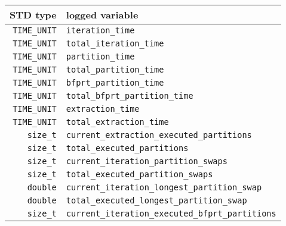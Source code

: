 \begin{tabularx}{\linewidth}{|r|X|}%
    \hline
    STD type & logged variable \\ %
    \hline
    \texttt{TIME\_UNIT} & \texttt{iteration\_time} \\ %
    \hline
    \texttt{TIME\_UNIT} & \texttt{total\_iteration\_time} \\ %
    \hline
    \texttt{TIME\_UNIT} & \texttt{partition\_time} \\ %
    \hline
    \texttt{TIME\_UNIT} & \texttt{total\_partition\_time} \\ %
    \hline
    \texttt{TIME\_UNIT} & \texttt{bfprt\_partition\_time} \\ %
    \hline
    \texttt{TIME\_UNIT} & \texttt{total\_bfprt\_partition\_time} \\ %
    \hline
    \texttt{TIME\_UNIT} & \texttt{extraction\_time} \\ %
    \hline
    \texttt{TIME\_UNIT} & \texttt{total\_extraction\_time} \\ %
    \hline
    \texttt{size\_t} & \texttt{current\_extraction\_executed\_partitions} \\ %
    \hline
    \texttt{size\_t} & \texttt{total\_executed\_partitions} \\ %
    \hline
    \texttt{size\_t} & \texttt{current\_iteration\_partition\_swaps} \\ %
    \hline
    \texttt{size\_t} & \texttt{total\_executed\_partition\_swaps} \\ %
    \hline
    \texttt{double} & \texttt{current\_iteration\_longest\_partition\_swap} \\ %
    \hline
    \texttt{double} & \texttt{total\_executed\_longest\_partition\_swap} \\ %
    \hline
    \texttt{size\_t} & \texttt{current\_iteration\_executed\_bfprt\_partitions} \\ %

\end{tabularx}

